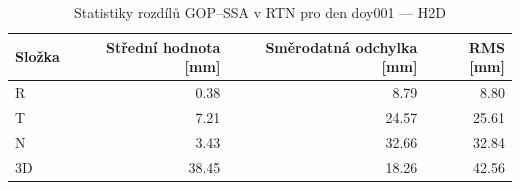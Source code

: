\begin{table}[H]
\centering
\caption{Statistiky rozdílů GOP–SSA v RTN pro den doy001 — H2D}
\label{tab:gop_vs_ssa_h2d_doy001_day_stats}
\begin{tabular}{lrrr}
\toprule
Složka & Střední hodnota [mm] & Směrodatná odchylka [mm] & RMS [mm] \\
\midrule
R & 0.38 & 8.79 & 8.80 \\
T & 7.21 & 24.57 & 25.61 \\
N & 3.43 & 32.66 & 32.84 \\
3D & 38.45 & 18.26 & 42.56 \\
\bottomrule
\end{tabular}
\end{table}
